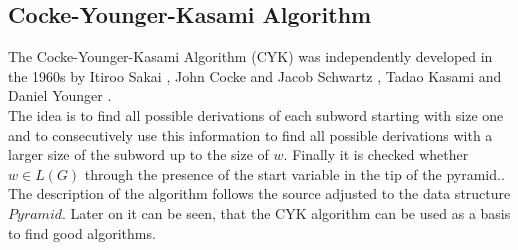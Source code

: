 \subsection{ Cocke-Younger-Kasami Algorithm}
The Cocke-Younger-Kasami Algorithm (CYK) was independently developed in the 1960s by Itiroo Sakai \cite{Sakai.1962}, John Cocke and Jacob Schwartz \cite{JohnCockeJacobT.Schwartz.1970}, Tadao Kasami \cite{Kasami.1966} and Daniel Younger \cite{YOUNGER.1967}.\\
The idea is to find all possible derivations of each subword starting with size one and to consecutively use this information to find all possible derivations with a larger size of the subword up to the size of $w$. Finally it is checked whether $w \in L(G)$ through the presence of the start variable in the tip of the pyramid.. \\
The description of the algorithm follows the source \cite{Hoffmann.2015} adjusted to the data structure $Pyramid$. 
Later on it can be seen, that the CYK algorithm can be used as a basis to find good algorithms.\\

